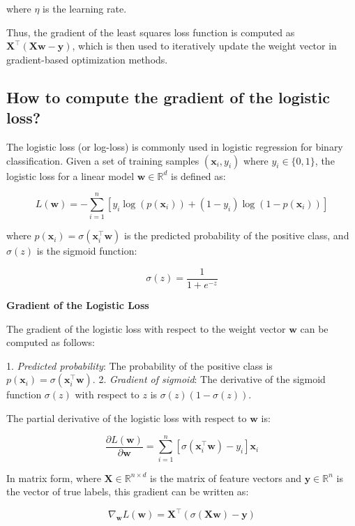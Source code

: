 where \( \eta \) is the learning rate.

Thus, the gradient of the least squares loss function is computed as \( \mathbf{X}^\top (\mathbf{Xw} - \mathbf{y}) \), which is then used to iteratively update the weight vector in gradient-based optimization methods.


\subsection{How to compute the gradient of the logistic loss?}

The logistic loss (or log-loss) is commonly used in logistic regression for binary classification. Given a set of training samples \( (\mathbf{x}_i, y_i) \) where \( y_i \in \{0, 1\} \), the logistic loss for a linear model \( \mathbf{w} \in \mathbb{R}^d \) is defined as:

\[
L(\mathbf{w}) = - \sum_{i=1}^{n} \left[ y_i \log(p(\mathbf{x}_i)) + (1 - y_i) \log(1 - p(\mathbf{x}_i)) \right]
\]

where \( p(\mathbf{x}_i) = \sigma(\mathbf{x}_i^\top \mathbf{w}) \) is the predicted probability of the positive class, and \( \sigma(z) \) is the sigmoid function:

\[
\sigma(z) = \frac{1}{1 + e^{-z}}
\]

\textbf{Gradient of the Logistic Loss}

The gradient of the logistic loss with respect to the weight vector \( \mathbf{w} \) can be computed as follows:

1. \textit{Predicted probability}: The probability of the positive class is \( p(\mathbf{x}_i) = \sigma(\mathbf{x}_i^\top \mathbf{w}) \).
2. \textit{Gradient of sigmoid}: The derivative of the sigmoid function \( \sigma(z) \) with respect to \( z \) is \( \sigma(z)(1 - \sigma(z)) \).

The partial derivative of the logistic loss with respect to \( \mathbf{w} \) is:

\[
\frac{\partial L(\mathbf{w})}{\partial \mathbf{w}} = \sum_{i=1}^{n} \left[ \sigma(\mathbf{x}_i^\top \mathbf{w}) - y_i \right] \mathbf{x}_i
\]

In matrix form, where \( \mathbf{X} \in \mathbb{R}^{n \times d} \) is the matrix of feature vectors and \( \mathbf{y} \in \mathbb{R}^n \) is the vector of true labels, this gradient can be written as:

\[
\nabla_{\mathbf{w}} L(\mathbf{w}) = \mathbf{X}^\top \left( \sigma(\mathbf{Xw}) - \mathbf{y} \right)
\]

